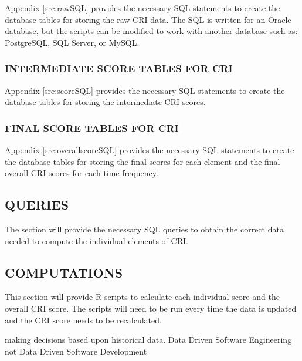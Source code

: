 \documentclass[SDSUThesis.tex]{subfiles}
\begin{document}
        Appendix \ref{src:rawSQL} provides the necessary SQL statements to create the 
        database tables for storing the raw CRI data.  The SQL is written for an Oracle
        database, but the scripts can be modified to work with another database
        such as: PostgreSQL, SQL Server, or MySQL.  
        
    \subsubsection{INTERMEDIATE SCORE TABLES FOR CRI}
    
        Appendix \ref{src:scoreSQL} provides the necessary SQL statements to create the 
        database tables for storing the intermediate CRI scores.
    
    \subsubsection{FINAL SCORE TABLES FOR CRI}
    
        Appendix \ref{src:overallscoreSQL} provides the necessary SQL statements to create the 
        database tables for storing the final scores for each element and the final 
        overall CRI scores for each time frequency.

\subsection{QUERIES}
    The section will provide the necessary SQL queries to obtain the correct data
    needed to compute the individual elements of CRI.
    
\subsection{COMPUTATIONS}
    This section will provide R scripts to calculate each individual score and the overall 
    CRI score. The scripts will need to be run every time the data is updated and the CRI
    score needs to be recalculated.
    
    

making decisions based upon historical data. 
Data Driven Software Engineering not Data Driven Software Development
\end{document}
